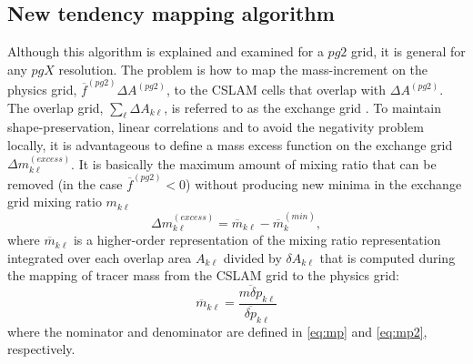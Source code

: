 \subsection{New tendency mapping algorithm}
Although this algorithm is explained and examined for a $pg2$ grid, it is general for any $pgX$ resolution. The problem is how to map the mass-increment on the physics grid, ${\overline{f}}^{(pg2)}\Delta A^{(pg2)}$, to the CSLAM cells that overlap with $\Delta A^{(pg2)}$. The overlap grid, $\sum_\ell \Delta A_{k\ell}$, is referred to as the exchange grid {\color{red}{edit - you equated overlap grid and exchange grid earlier}}. To maintain shape-preservation, linear correlations and to avoid the negativity problem locally, it is advantageous to define a mass excess function on the exchange grid $\Delta m_{k\ell}^{(excess)}$. It is basically the maximum amount of mixing ratio that can be removed (in the case ${\overline{f}}^{(pg2)}<0$) without producing new minima in the exchange grid mixing ratio $m_{k\ell}$
\begin{equation}
\Delta m^{(excess)}_{k\ell}=\overline{m}_{k\ell}-\overline{m}_k^{(min)},
\end{equation}
where $\overline{m}_{k\ell}$ is a higher-order representation of the mixing ratio representation integrated over each overlap area $A_{k\ell}$ divided by $\delta A_{k\ell}$ that is computed during the mapping of tracer mass from the CSLAM grid to the physics grid:
\begin{equation}
\label{eq:moverlap}
\overline{m}_{k\ell}=\frac{\overline{m\delta p}_{k\ell}}{\overline{\delta p}_{k\ell}}
\end{equation}
where the nominator and denominator are defined in \eqref{eq:mp} and \eqref{eq:mp2}, respectively. 

